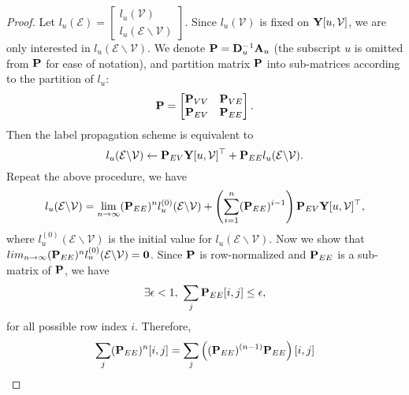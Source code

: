 \documentclass[sigconf]{acmart}
\begin{document}
		\begin{proof}
			Let $l_u(\mathcal E) = \begin{bmatrix}l_u(\mathcal V)\\[0.3 em]l_u(\mathcal E \backslash \mathcal V)\end{bmatrix}$.			Since $l_u(\mathcal V)$ is fixed on ${\bf Y}[u, \mathcal V]$, we are only interested in $l_u(\mathcal E \backslash \mathcal V)$.
			We denote ${\bf P} = {\bf D}_u^{-1} {\bf A}_u$ (the subscript $u$ is omitted from $\bf P$ for ease of notation), and partition matrix $\bf P$ into sub-matrices according to the partition of $l_u$:
			\begin{equation*}
				{\bf P} = \begin{bmatrix}
					{\bf P}_{VV} \quad {\bf P}_{VE}\\
					{\bf P}_{EV} \quad {\bf P}_{EE}\\
				\end{bmatrix}.
			\end{equation*}
			Then the label propagation scheme is equivalent to
			\begin{equation}
			\label{eq:iteration}
				l_u(\mathcal E \backslash \mathcal V) \leftarrow {\bf P}_{EV} {\bf Y}[u, \mathcal V]^\top + {\bf P}_{EE} l_u(\mathcal E \backslash \mathcal V).
			\end{equation}
			Repeat the above procedure, we have
			\begin{equation}
			\label{eq:expand}
				l_u(\mathcal E \backslash \mathcal V) = \lim_{n \rightarrow \infty} ({\bf P}_{EE})^n l_u^{(0)}(\mathcal E \backslash \mathcal V) + \left( \sum_{i=1}^n ({\bf P}_{EE})^{i-1} \right) {\bf P}_{EV} {\bf Y}[u, \mathcal V]^\top,
			\end{equation}
			where $l_u^{(0)}(\mathcal E \backslash \mathcal V)$ is the initial value for $l_u(\mathcal E \backslash \mathcal V)$.
			Now we show that $lim_{n \rightarrow \infty} ({\bf P}_{EE})^n l_u^{(0)}(\mathcal E \backslash \mathcal V) = {\bf 0}$.
			Since $\bf P$ is row-normalized and ${\bf P}_{EE}$ is a sub-matrix of $\bf P$, we have
			\begin{equation*}
				\exists \epsilon < 1, \ \sum_j {\bf P}_{EE} [i, j] \leq \epsilon,
			\end{equation*}
			for all possible row index $i$.
			Therefore,
			\begin{equation*}
			\begin{split}
				\sum_j ({\bf P}_{EE})^n [i, j] &= \sum_j \left( ({\bf P}_{EE})^{(n-1)} {\bf P}_{EE} \right) [i, j]\\

\end{split}
\end{equation*}
\end{proof}
\end{document}
